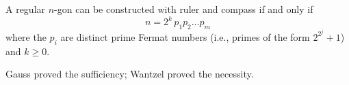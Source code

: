 A regular $n$-gon can be constructed with ruler and compass if and only if
$$n = 2^k \, p_1 p_2 \ldots p_m$$
where the $p_i$ are distinct prime Fermat numbers (i.e., primes of the form $2^{2^j} + 1$) and $k \geq 0$.

Gauss proved the sufficiency; Wantzel proved the necessity.
